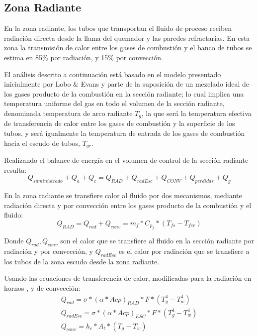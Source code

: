 \subsection{Zona Radiante}
\par En la zona radiante, los tubos que transportan el fluido de proceso reciben radiación directa desde la llama del quemador y las paredes refractarias. En esta zona la transmisión de calor entre los gases de combustión y el banco de tubos se estima en 85\% por radiación, y 15\% por convección.
\par El análisis descrito a continuación está basado en el modelo presentado inicialmente por Lobo \& Evans \cite{bib:rad} y parte de la suposición de un mezclado ideal de los gases producto de la combustión en la sección radiante; lo cual implica una temperatura uniforme del gas en todo el volumen de la sección radiante, denominada temperatura de arco radiante $T_g$, la que será la temperatura efectiva de transferencia de calor entre los gases de combustión y la superficie de los tubos, y será igualmente la temperatura de entrada de los gases de combustión hacia el escudo de tubos, $T_{gr}$.
\par Realizando el balance de energía en el volumen de control de la sección radiante resulta:
\begin{equation}
    \label{eq:rad}
    Q_{suministrado} + Q_{a} + Q_{c} = 
    Q_{RAD} + Q_{radEsc} + Q_{CONV} + Q_{perdidas} + Q_{g}
\end{equation}
\par En la zona radiante se transfiere calor al fluido por dos mecanismos, mediante radiación directa y por convección entre los gases producto de la combustión y el fluido:
\begin{equation}
    \label{eq:rad-fluid}
    Q_{RAD} = Q_{rad} + Q_{conv} = \dot m_f * C_{p_f} * (T_{fs} - T_{fer})
\end{equation}
\par Donde $Q_{rad}, Q_{conv}$ son el calor que se transfiere al fluido en la sección radiante por radiación y por convección, y $Q_{radEsc}$ es el calor por radiación que se transfiere a los tubos de la zona escudo desde la zona radiante.
\par Usando las ecuaciones de transferencia de calor, modificadas para la radiación en hornos \cite{bib:mekler}, y de convección:
\begin{gather}
\label{eq:radiac}
    Q_{rad} = \sigma *(\alpha *Acp)_{RAD} *F *(T_{g}^{4} -T_{w}^{4})\\
    Q_{radEsc} = \sigma *(\alpha *Acp)_{ESC} *F *(T_{g}^{4} -T_{w}^{4})\\
    Q_{conv} = h_{c} * A_t * (T_g - T_w)
\end{gather}
